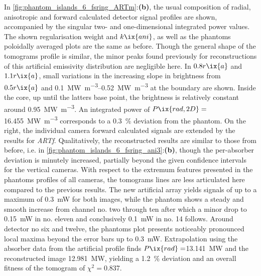                In \cref{fig:phantom_islands_6_fsring_ARTm}:\textbf{(b)}, the usual composition of radial, anisotropic and forward calculated detector signal profiles are shown, accompanied by the singular two- and one-dimensional integrated power values. The shown regularisation weight and $k\ix{ani}$, as well as the phantoms poloidally averaged plots are the same as before. Though the general shape of the tomograms profile is similar, the minor peaks found previously for reconstructions of this artificial emissivity distribution are negligible here. In $0.8r\ix{a}$ and $1.1r\ix{a}$, small variations in the increasing slope in brightness from $0.5r\ix{a}$ and \SIrange{0.1}{0.52}{\mega\watt\per\cubic\meter} at the boundary are shown. Inside the core, up until the latters base point, the brightness is relatively constant around \SI{0.95}{\mega\watt\per\cubic\meter}. An integrated power of $P\ix{rad,2D}=$\SI{16.455}{\mega\watt\per\cubic\meter} corresponds to a \SI{0.3}{\percent} deviation from the phantom. On the right, the individual camera forward calculated signals are extended by the results for \textit{ARTf}. Qualitatively, the reconstructed results are similar to those from before, i.e. in \cref{fig:phantom_islands_6_fsring_ani3}:\textbf{(b)}, though the per-absorber deviation is minutely increased, partially beyond the given confidence intervals for the vertical cameras. With respect to the extremum features presented in the phantoms profiles of all cameras, the tomograms lines are less articulated here compared to the previous results. The new artificial array yields signals of up to a maximum of \SI{0.3}{\milli\watt} for both images, while the phantom shows a steady and smooth increase from channel no. two through ten after which a minor drop to \SI{0.15}{\milli\watt} in no. eleven and conclusively \SI{0.1}{\milli\watt} in no. 14 follows. Around detector no six and twelve, the phantoms plot presents noticeably pronounced local maxima beyond the error bars up to \SI{0.3}{\milli\watt}. Extrapolation using the absorber data from the artificial profile finds $P\ix{rad}=$\SI{13.141}{\mega\watt} and the reconstructed image \SI{12.981}{\mega\watt}, yielding a \SI{1.2}{\percent} deviation and an overall fitness of the tomogram of $\chi^{2}=$\SI{0.837}{\arbitraryunit}.\\%
